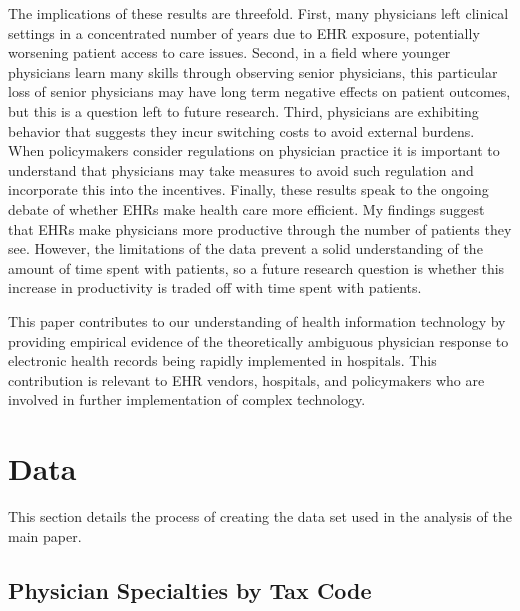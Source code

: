 \documentclass[12pt]{article}
\begin{document}
The implications of these results are threefold. First, many physicians left clinical settings in a concentrated number of years due to EHR exposure, potentially worsening patient access to care issues. Second, in a field where younger physicians learn many skills through observing senior physicians, this particular loss of senior physicians may have long term negative effects on patient outcomes, but this is a question left to future research. Third, physicians are exhibiting behavior that suggests they incur switching costs to avoid external burdens. When policymakers consider regulations on physician practice it is important to understand that physicians may take measures to avoid such regulation and incorporate this into the incentives. Finally, these results speak to the ongoing debate of whether EHRs make health care more efficient. My findings suggest that EHRs make physicians more productive through the number of patients they see. However, the limitations of the data prevent a solid understanding of the amount of time spent with patients, so a future research question is whether this increase in productivity is traded off with time spent with patients.  

This paper contributes to our understanding of health information technology by providing empirical evidence of the theoretically ambiguous physician response to electronic health records being rapidly implemented in hospitals. This contribution is relevant to EHR vendors, hospitals, and policymakers who are involved in further implementation of complex technology. 




\clearpage

\renewcommand*{\bibfont}{\footnotesize}

\printbibliography

\clearpage


\appendix

\section{Data}\label{app:data}

This section details the process of creating the data set used in the analysis of the main paper. 

\subsection{Physician Specialties by Tax Code}\label{sec:taxcode}
\end{document}
